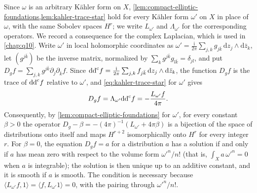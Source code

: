 Since $\omega$ is an arbitrary K\"ahler form on $X$, \cref{lem:compact-elliptic-foundations,lem:kahler-trace-star} hold for every K\"ahler form $\omega'$ on $X$ in place of $\omega$, with the same Sobolev spaces $H^r$; we write $L_{\omega'}$ and $\Lambda_{\omega'}$ for the corresponding operators. We record a consequence for the complex Laplacian, which is used in \cref{chap:q10}. Write $\omega'$ in local holomorphic coordinates as $\omega'=\frac{\mathrm i}{2\pi}\sum_{j,k}g_{j\bar k}\,\mathrm dz_j\wedge\mathrm d\bar z_k$, let $(g^{j\bar k})$ be the inverse matrix, normalized by $\sum_kg^{j\bar k}g_{l\bar k}=\delta_{jl}$, and put $D_gf=\sum_{j,k}g^{j\bar k}\partial_j\partial_{\bar k}f$. Since $\mathrm{dd}^{\mathrm{c}} f=\frac{\mathrm i}{2\pi}\sum_{j,k}f_{j\bar k}\,\mathrm dz_j\wedge\mathrm d\bar z_k$, the function $D_gf$ is the trace of $\mathrm{dd}^{\mathrm{c}} f$ relative to $\omega'$, and \eqref{eq:kahler-trace-star} for $\omega'$ gives
\begin{equation}\label{eq:complex-laplacian-trace}
 D_gf=\Lambda_{\omega'}\mathrm{dd}^{\mathrm{c}} f=-\frac{L_{\omega'}f}{4\pi}.
\end{equation}
Consequently, by \cref{lem:compact-elliptic-foundations} for $\omega'$, for every constant $\beta>0$ the operator $D_g-\beta=-(4\pi)^{-1}(L_{\omega'}+4\pi\beta)$ is a bijection of the space of distributions onto itself and maps $H^{r+2}$ isomorphically onto $H^r$ for every integer $r$. For $\beta=0$, the equation $D_gf=a$ for a distribution $a$ has a solution if and only if $a$ has mean zero with respect to the volume form $\omega'^n/n!$ (that is, $\int_Xa\,\omega'^n=0$ when $a$ is integrable); the solution is then unique up to an additive constant, and it is smooth if $a$ is smooth. The condition is necessary because $\langle L_{\omega'}f,1\rangle=\langle f,L_{\omega'}1\rangle=0$, with the pairing through $\omega'^n/n!$.

